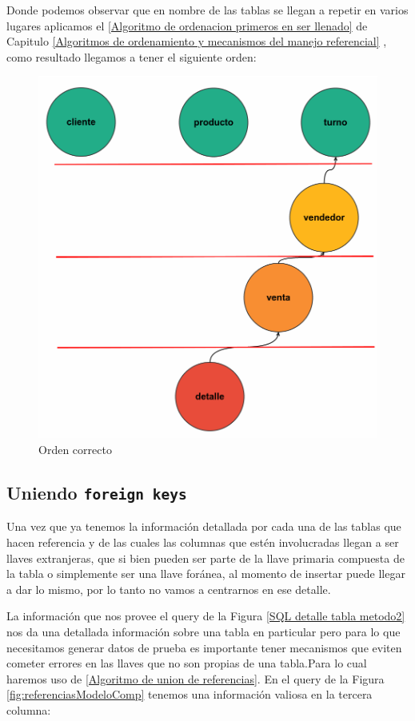 Donde podemos observar que en nombre de las tablas se llegan a repetir en varios lugares aplicamos el \ref{Algoritmo de ordenacion primeros en ser llenado} de Capitulo \ref{Algoritmos de ordenamiento y mecanismos del manejo referencial} , como resultado llegamos a tener el siguiente orden:
\begin{figure}[H]
 \centering
 \includegraphics[scale=0.2]{images/ordenadocomp.png}
 \caption{Orden correcto}
 \end{figure}
  
\subsection{Uniendo \texttt{foreign keys}}
Una vez que ya tenemos la informaci\'on detallada por cada una de las tablas que hacen referencia y de las cuales las columnas que est\'en involucradas llegan a ser llaves extranjeras, que si bien pueden ser parte de la llave primaria compuesta de la tabla o simplemente ser una llave for\'anea, al momento de insertar puede llegar a dar lo mismo, por lo tanto no vamos a centrarnos en ese detalle.

La informaci\'on que nos provee el query de la Figura \ref{SQL detalle tabla metodo2} nos da una detallada informaci\'on sobre una tabla en particular pero para lo que necesitamos generar datos de prueba es importante tener mecanismos que eviten cometer errores en las llaves que no son propias de una tabla.Para lo cual haremos uso de \ref{Algoritmo de union de referencias}. En el query de la Figura \ref{fig:referenciasModeloComp} tenemos una informaci\'on valiosa en la tercera columna:

